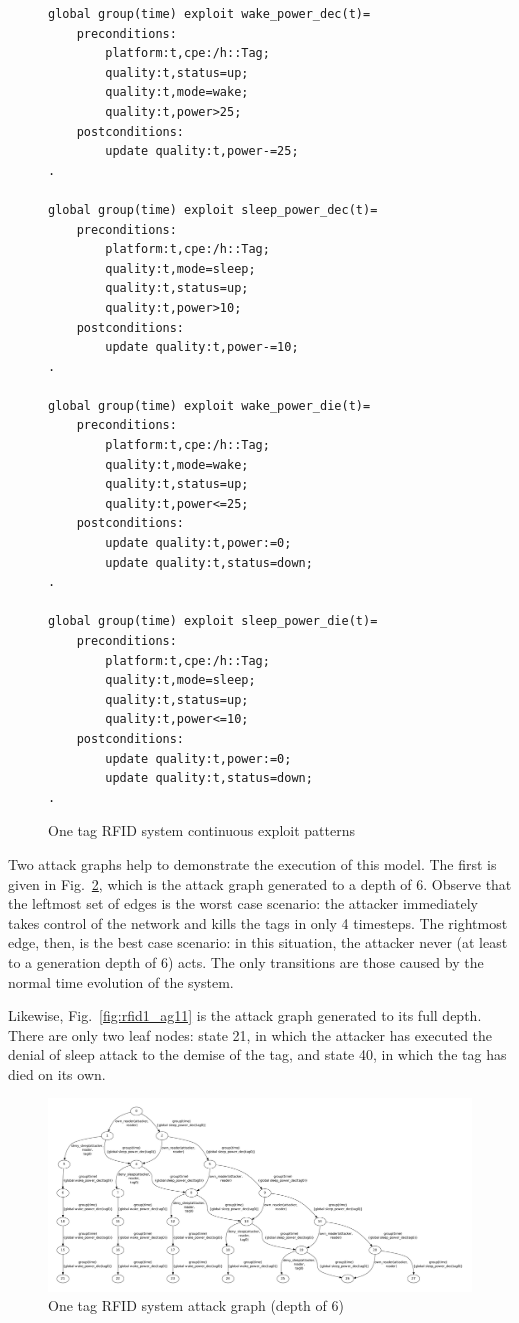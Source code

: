 \begin{figure}
\begin{lstlisting}
global group(time) exploit wake_power_dec(t)=
    preconditions:
        platform:t,cpe:/h::Tag;
        quality:t,status=up;
        quality:t,mode=wake;
        quality:t,power>25;
    postconditions:
        update quality:t,power-=25;
.

global group(time) exploit sleep_power_dec(t)=
    preconditions:
        platform:t,cpe:/h::Tag;
        quality:t,mode=sleep;
        quality:t,status=up;
        quality:t,power>10;
    postconditions:
        update quality:t,power-=10;
.

global group(time) exploit wake_power_die(t)=
    preconditions:
        platform:t,cpe:/h::Tag;
        quality:t,mode=wake;
        quality:t,status=up;
        quality:t,power<=25;
    postconditions:
        update quality:t,power:=0;
        update quality:t,status=down;
.

global group(time) exploit sleep_power_die(t)=
    preconditions:
        platform:t,cpe:/h::Tag;
        quality:t,mode=sleep;
        quality:t,status=up;
        quality:t,power<=10;
    postconditions:
        update quality:t,power:=0;
        update quality:t,status=down;
.
\end{lstlisting}
\caption{One tag RFID system continuous exploit patterns}
\label{fig:rfid1_xp2}
\end{figure}

Two attack graphs help to demonstrate the execution of this model. The first is
given in Fig.~\ref{fig:rfid1_ag6}, which is the attack graph generated to a
depth of 6. Observe that the leftmost set of edges is the worst case
scenario: the attacker immediately takes control of the network and kills
the tags in only 4 timesteps. The rightmost edge, then, is the best case
scenario: in this situation, the attacker never (at least to a generation
depth of 6) acts. The only transitions are those caused by the normal
time evolution of the system.

Likewise, Fig.~\ref{fig:rfid1_ag11} is the attack graph generated to its
full depth. There are only two leaf nodes: state 21, in which the attacker
has executed the denial of sleep attack to the demise of the tag, and state
40, in which the tag has died on its own.

\begin{figure}
\includegraphics[width=\textwidth]{ag_dash7/sleep_ag_6}
\caption{One tag RFID system attack graph (depth of 6)}
\label{fig:rfid1_ag6}
\end{figure}


